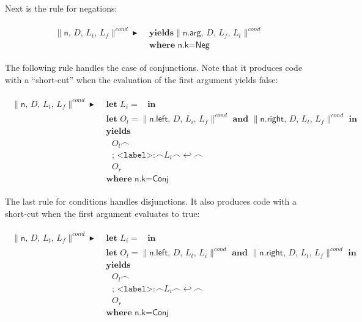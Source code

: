 \documentclass{article}
\newcommand{\trad}[2]{\ensuremath{\lVert \textsf{#1} \rVert^{\textit{#2}}}}
\newcommand{\nl}[0]{\ensuremath{\hookleftarrow}}
\DeclareMathOperator{\conc}{\smallfrown}
\DeclareMathOperator{\isdef}{\blacktriangleright}
\DeclareMathOperator{\name}{\mathcal{L}()}
\begin{document}
Next is the rule for negations:
\begin{framed}
\begin{align}
\begin{split}
  \trad{n, $D$, $L_t$, $L_f$}{cond} \isdef
  & \textbf{ yields} \trad{n.arg, $D$, $L_f$, $L_t$}{cond} \\
  & \textbf{ where } \textsf{n.k} = \textsf{Neg}
\end{split}
\end{align}
\end{framed}

The following rule handles the case of conjunctions. Note that it produces code
with a ``short-cut'' when the evaluation of the first argument yields false:
\begin{framed}
\begin{align}
\begin{split}
  \trad{n, $D$, $L_t$, $L_f$}{cond} \isdef
  & \textbf{ let } L_i = \name \textbf{ in } \\
  & \textbf{ let } O_l = \trad{n.left, $D$, $L_i$, $L_f$}{cond} \textbf{ and } \trad{n.right, $D$, $L_t$, $L_f$}{cond} \textbf{ in } \\
  & \textbf{ yields} \\
  & \quad O_l \conc \\
  & \quad \texttt{; <label>:} \conc L_i \conc \nl \conc \\
  & \quad O_r \\
  & \textbf{ where } \textsf{n.k} = \textsf{Conj}
\end{split}
\end{align}
\end{framed}

The last rule for conditions handles disjunctions. It also produces
code with a short-cut when the first argument evaluates to true:
\begin{framed}
\begin{align}
\begin{split}
  \trad{n, $D$, $L_t$, $L_f$}{cond} \isdef
  & \textbf{ let } L_i = \name \textbf{ in } \\
  & \textbf{ let } O_l = \trad{n.left, $D$, $L_t$, $L_i$}{cond} \textbf{ and } \trad{n.right, $D$, $L_t$, $L_f$}{cond} \textbf{ in } \\
  & \textbf{ yields} \\
  & \quad O_l \conc \\
  & \quad \texttt{; <label>:} \conc L_i \conc \nl \conc \\
  & \quad O_r \\
  & \textbf{ where } \textsf{n.k} = \textsf{Conj}
\end{split}
\end{align}
\end{framed}
\end{document}
